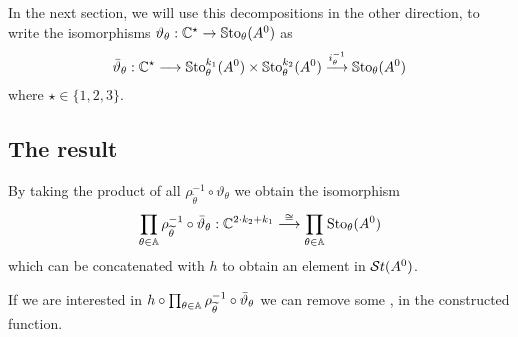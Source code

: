 In the next section, we will use this decompositions in the other direction, to
write the isomorphisms $\vartheta_\theta:\mathbb{C}^\star\to \operatorname{\mathbb{S}to}_\theta(A^0)$ as
\[
  \bar\vartheta_\theta:
  \mathbb{C}^\star
  \longrightarrow\operatorname{\mathbb{S}to}_\theta^{k_1}(A^0)\times\operatorname{\mathbb{S}to}_\theta^{k_2}(A^0)
  \overset{i_\theta^{-1}}\longrightarrow\operatorname{\mathbb{S}to}_\theta(A^0)
\]
where $\star\in\{1,2,3\}$.

\begin{comment}
  \begin{rem}
    Since we know, that $\Sto_{\theta}^k$ is trivial, if $k\notin\cK_\theta$ we
    can write
    \begin{align*}
      \prod_{\theta\in\cA}\prod_{k\in\cK}\Sto_\theta^k(A^0)
      &\equiv \prod_{k\in\cK}\prod_{\theta\in\cA}\Sto_\theta^k(A^0)
      \\&= \prod_{k\in\cK} \prod_{j=1}^{2\cdot k}
     \Sto_{\theta_0+\frac{\pi}{k}\cdot j}^k(A^0) \,.
    \end{align*}
  \end{rem}
\end{comment}

\subsection{The result}
\begin{prop}
  By taking the product of all $\rho_{\tilde\theta}^{-1}\circ\vartheta_\theta$
  we obtain the isomorphism
  \[
    \prod_{\theta\in\mathbb{A}}\rho_{\widetilde\theta}^{-1}\circ\bar\vartheta_\theta:
    \mathbb{C}^{2\cdot k_2 + k_1}
    \overset\cong\longrightarrow
    \prod_{\theta\in\mathbb{A}}\operatorname{Sto}_\theta(A^0)
  \]
  which can be concatenated with $h$ to obtain an element in $\mathcal{S}{}t(A^0)$.
  \begin{s-rem}
    If we are interested in $h\circ\prod_{\theta\in\mathbb{A}}\rho_{\widetilde\theta}^{-1}
    \circ\bar\vartheta_\theta$ we can remove some , in the
    constructed function.
  \end{s-rem}
\end{prop}

